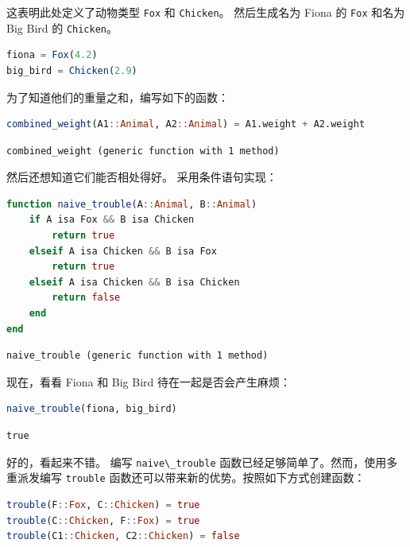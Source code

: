 \documentclass[
  notoc %
]{tufte-book}
\newcommand{\passthrough}[1]{#1}
\begin{document}
这表明此处定义了动物类型 \passthrough{\lstinline!Fox!} 和
\passthrough{\lstinline!Chicken!}。 然后生成名为 Fiona 的
\passthrough{\lstinline!Fox!} 和名为 Big Bird 的
\passthrough{\lstinline!Chicken!}。

\begin{lstlisting}[language=Julia]
fiona = Fox(4.2)
big_bird = Chicken(2.9)
\end{lstlisting}

为了知道他们的重量之和，编写如下的函数：

\begin{lstlisting}[language=Julia]
combined_weight(A1::Animal, A2::Animal) = A1.weight + A2.weight
\end{lstlisting}

\begin{lstlisting}[language=Output]
combined_weight (generic function with 1 method)
\end{lstlisting}

然后还想知道它们能否相处得好。 采用条件语句实现：

\begin{lstlisting}[language=Julia]
function naive_trouble(A::Animal, B::Animal)
    if A isa Fox && B isa Chicken
        return true
    elseif A isa Chicken && B isa Fox
        return true
    elseif A isa Chicken && B isa Chicken
        return false
    end
end
\end{lstlisting}

\begin{lstlisting}[language=Output]
naive_trouble (generic function with 1 method)
\end{lstlisting}

现在，看看 Fiona 和 Big Bird 待在一起是否会产生麻烦：

\begin{lstlisting}[language=Julia]
naive_trouble(fiona, big_bird)
\end{lstlisting}

\begin{lstlisting}[language=Output]
true
\end{lstlisting}

好的，看起来不错。 编写 \passthrough{\lstinline!naive\_trouble!}
函数已经足够简单了。然而，使用多重派发编写
\passthrough{\lstinline!trouble!}
函数还可以带来新的优势。按照如下方式创建函数：

\begin{lstlisting}[language=Julia]
trouble(F::Fox, C::Chicken) = true
trouble(C::Chicken, F::Fox) = true
trouble(C1::Chicken, C2::Chicken) = false
\end{lstlisting}
\end{document}
